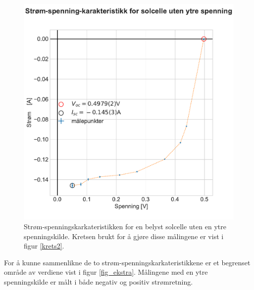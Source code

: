 \documentclass[%
 reprint,
 amsmath,amssymb,
 aps,
 norsk,
 booktabs
]{revtex4-1}
\begin{document}
\begin{figure}
  \centering
  \includegraphics[scale=0.47]{strom_spenning_karr.pdf}
  \caption{Strøm-spenningskarkateristikken for en belyst solcelle uten en ytre spenningskilde. Kretsen brukt for å gjøre disse målingene er vist i figur \vref{krets2}.}
  \label{resultat_uten_spenning}
\end{figure}
For å kunne sammenlikne de to strøm-spenningskarkateristikkene er et begrenset område av verdiene vist i figur \vref{fig_ekstra}. Målingene med en ytre spenningskilde er målt i både negativ og positiv strømretning.
\end{document}
